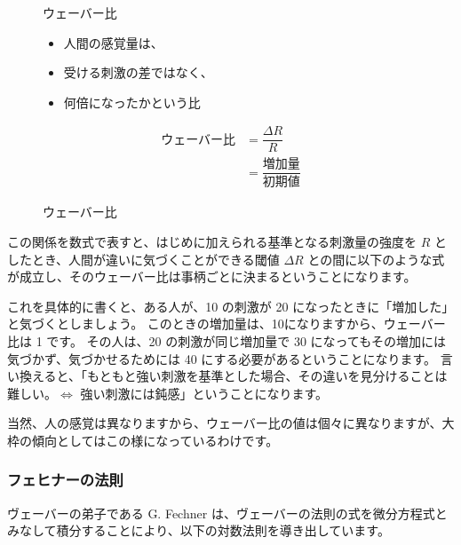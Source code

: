 \documentclass[uplatex,dvipdfmx,a4paper,11pt]{jsarticle}
\begin{document}
\begin{figure}[htb]
	\begin{center}
		\begin{minipage}{0.45\textwidth}
			\large
			\begin{itembox}[l]{ウェーバー比}
				\begin{itemize}
					\item 人間の感覚量は、
					\item 受ける刺激の差ではなく、
					\item 何倍になったかという比
				\end{itemize}
			\end{itembox}
		\end{minipage}
		\begin{minipage}{0.45\textwidth}
			\large
			\begin{align*}
				\text{ウェーバー比} &= \dfrac{\Delta R}{R} \\
				&= \dfrac{\text{増加量}}{\text{初期値}}
			\end{align*}
		\end{minipage}
		\caption{ウェーバー比}
		\label{fig:weber}
	\end{center}
\end{figure}

この関係を数式で表すと、はじめに加えられる基準となる刺激量の強度を $R$ としたとき、人間が違いに気づくことができる閾値 $\Delta R$ との間に以下のような式が成立し、そのウェーバー比は事柄ごとに決まるということになります。

これを具体的に書くと、ある人が、10 の刺激が 20 になったときに「増加した」と気づくとしましょう。
このときの増加量は、10になりますから、ウェーバー比は 1 です。
その人は、20 の刺激が同じ増加量で 30 になってもその増加には気づかず、気づかせるためには 40 にする必要があるということになります。
言い換えると、「もともと強い刺激を基準とした場合、その違いを見分けることは難しい。$\Leftrightarrow$ 強い刺激には鈍感」ということになります。

当然、人の感覚は異なりますから、ウェーバー比の値は個々に異なりますが、大枠の傾向としてはこの様になっているわけです。

\subsubsection{フェヒナーの法則}

ヴェーバーの弟子である G. Fechner は、ヴェーバーの法則の式を微分方程式とみなして積分することにより、以下の対数法則を導き出しています。
\end{document}
